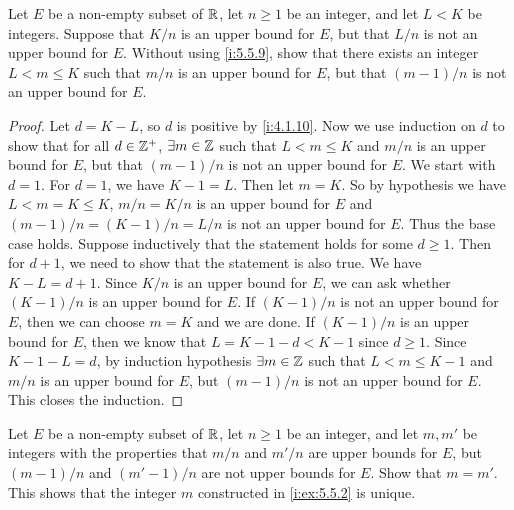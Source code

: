 \begin{ex}\label{i:ex:5.5.2}
  Let \(E\) be a non-empty subset of \(\mathbb{R}\), let \(n \geq 1\) be an integer, and let \(L < K\) be integers.
  Suppose that \(K / n\) is an upper bound for \(E\), but that \(L / n\) is not an upper bound for \(E\).
  Without using \cref{i:5.5.9}, show that there exists an integer \(L < m \leq K\) such that \(m / n\) is an upper bound for \(E\), but that \((m - 1) / n\) is not an upper bound for \(E\).
\end{ex}

\begin{proof}
  Let \(d = K - L\), so \(d\) is positive by \cref{i:4.1.10}.
  Now we use induction on \(d\) to show that for all \(d \in \mathbb{Z}^+\), \(\exists m \in \mathbb{Z}\) such that \(L < m \leq K\) and \(m / n\) is an upper bound for \(E\), but that \((m - 1) / n\) is not an upper bound for \(E\).
  We start with \(d = 1\).
  For \(d = 1\), we have \(K - 1 = L\).
  Then let \(m = K\).
  So by hypothesis we have \(L < m = K \leq K\), \(m / n = K / n\) is an upper bound for \(E\) and \((m - 1) / n = (K - 1) / n = L / n\) is not an upper bound for \(E\).
  Thus the base case holds.
  Suppose inductively that the statement holds for some \(d \geq 1\).
  Then for \(d + 1\), we need to show that the statement is also true.
  We have \(K - L = d + 1\).
  Since \(K / n\) is an upper bound for \(E\), we can ask whether \((K - 1) / n\) is an upper bound for \(E\).
  If \((K - 1) / n\) is not an upper bound for \(E\), then we can choose \(m = K\) and we are done.
  If \((K - 1) / n\) is an upper bound for \(E\), then we know that \(L = K - 1 - d < K - 1\) since \(d \geq 1\).
  Since \(K - 1 - L = d\), by induction hypothesis \(\exists m \in \mathbb{Z}\) such that \(L < m \leq K - 1\) and \(m / n\) is an upper bound for \(E\), but \((m - 1) / n\) is not an upper bound for \(E\).
  This closes the induction.
\end{proof}

\begin{ex}\label{i:ex:5.5.3}
  Let \(E\) be a non-empty subset of \(\mathbb{R}\), let \(n \geq 1\) be an integer, and let \(m, m'\) be integers with the properties that \(m / n\) and \(m' / n\) are upper bounds for \(E\), but \((m - 1) / n\) and \((m' - 1) / n\) are not upper bounds for \(E\).
  Show that \(m = m'\).
  This shows that the integer \(m\) constructed in \cref{i:ex:5.5.2} is unique.
\end{ex}

